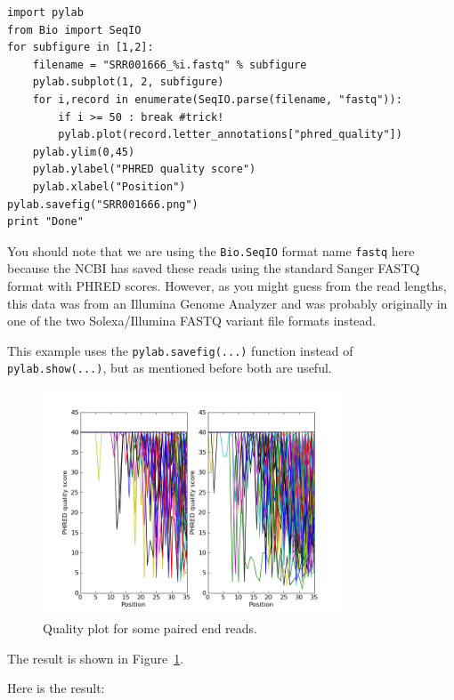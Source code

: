 \documentclass{report}
\begin{document}
\begin{verbatim}
import pylab
from Bio import SeqIO
for subfigure in [1,2]:
    filename = "SRR001666_%i.fastq" % subfigure
    pylab.subplot(1, 2, subfigure)
    for i,record in enumerate(SeqIO.parse(filename, "fastq")):
        if i >= 50 : break #trick!
        pylab.plot(record.letter_annotations["phred_quality"])
    pylab.ylim(0,45)
    pylab.ylabel("PHRED quality score")
    pylab.xlabel("Position")
pylab.savefig("SRR001666.png")
print "Done"
\end{verbatim}

You should note that we are using the \verb|Bio.SeqIO| format name \texttt{fastq}
here because the NCBI has saved these reads using the standard Sanger FASTQ format
with PHRED scores. However, as you might guess from the read lengths, this data was
from an Illumina Genome Analyzer and was probably originally in one of the two
Solexa/Illumina FASTQ variant file formats instead.

This example uses the \verb|pylab.savefig(...)| function instead of
\verb|pylab.show(...)|, but as mentioned before both are useful.
\begin{latexonly}
\begin{figure}[htbp]
\centering
\includegraphics[width=0.8\textwidth]{images/SRR001666.png}
\caption{Quality plot for some paired end reads.}
\label{fig:paired-end-qual-plot}
\end{figure}
The result is shown in Figure~\ref{fig:paired-end-qual-plot}.
\end{latexonly}
\begin{htmlonly}
Here is the result:


\end{htmlonly}
\end{document}
